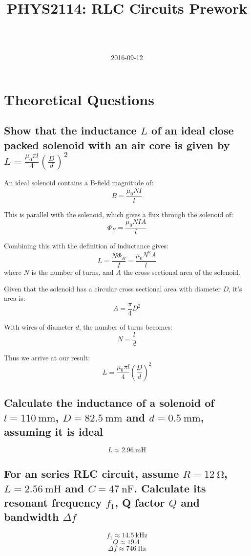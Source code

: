 \documentclass[a4paper]{scrartcl}
\begin{document}
\title{PHYS2114: RLC Circuits Prework}
\author{ \\ \\ }
\date{2016-09-12}
\maketitle

\section{Theoretical Questions}
\subsection{Show that the inductance \(L\) of an ideal close packed solenoid with an air core is given by \(L = \frac{\mu_0 \pi l}{4} \left(\frac{D}{d}\right)^2\)}
An ideal solenoid contains a B-field magnitude of:
\[B = \frac{\mu_0 N I}{l}\]

This is parallel with the solenoid, which gives a flux through the solenoid of:
\[\Phi_B = \frac{\mu_0 N I A}{l}\]

Combining this with the definition of inductance gives:
\[L = \frac{N \Phi_B}{I} = \frac{\mu_0 N^2 A}{l}\]
where \(N\) is the number of turns, and \(A\) the cross sectional area of the solenoid.

Given that the solenoid has a circular cross sectional area with diameter \(D\), it's area is:
\[A = \frac{\pi}{4} D^2\]

With wires of diameter \(d\), the number of turns becomes:
\[N = \frac{l}{d}\]

Thus we arrive at our result:
\[L = \frac{\mu_0 \pi l}{4} \left(\frac{D}{d}\right)^2\]

\subsection{Calculate the inductance of a solenoid of \(l = \SI{110}{\milli\metre}\), \(D = \SI{82.5}{\milli\metre}\) and \(d = \SI{0.5}{\milli\metre}\), assuming it is ideal}
\[L \approx \SI{2.96}{\milli\henry}\]

\subsection{For an series RLC circuit, assume \(R = \SI{12}{\ohm}\), \(L = \SI{2.56}{\milli\henry}\) and \(C = \SI{47}{\nano\farad}\). Calculate its resonant frequency \(f_1\), Q factor \(Q\) and bandwidth \(\Delta f\)}
\[f_1 \approx \SI{14.5}{\kilo\hertz}\]
\[Q \approx \SI{19.4}{}\]
\[\Delta f \approx \SI{746}{\hertz}\]
\end{document}
